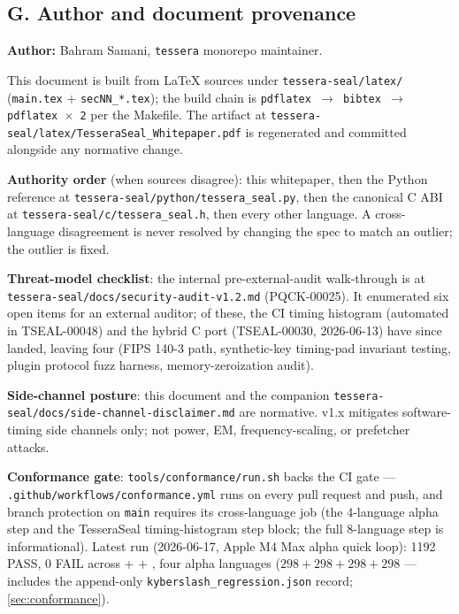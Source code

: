 \subsection*{G. Author and document provenance}
\label{sec:appendix:provenance}

\textbf{Author:} Bahram Samani, \texttt{tessera} monorepo maintainer.

This document is built from LaTeX sources under \texttt{tessera-seal/latex/} (\texttt{main.tex} + \texttt{secNN\_*.tex}); the build chain is \texttt{pdflatex $\rightarrow$ bibtex $\rightarrow$ pdflatex $\times$ 2} per the Makefile. The artifact at \texttt{tessera-seal/latex/TesseraSeal\_Whitepaper.pdf} is regenerated and committed alongside any normative change.

\textbf{Authority order} (when sources disagree): this whitepaper, then the Python reference at \texttt{tessera-seal/python/tessera\_seal.py}, then the canonical C ABI at \texttt{tessera-seal/c/tessera\_seal.h}, then every other language. A cross-language disagreement is never resolved by changing the spec to match an outlier; the outlier is fixed.

\textbf{Threat-model checklist}: the internal pre-external-audit walk-through is at \texttt{tessera-seal/docs/security-audit-v1.2.md} (PQCK-00025). It enumerated six open items for an external auditor; of these, the CI timing histogram (automated in TSEAL-00048) and the hybrid C port (TSEAL-00030, 2026-06-13) have since landed, leaving four (FIPS 140-3 path, synthetic-key timing-pad invariant testing, plugin protocol fuzz harness, memory-zeroization audit).

\textbf{Side-channel posture}: this document and the companion \texttt{tessera-seal/docs/side-channel-disclaimer.md} are normative. v1.x mitigates software-timing side channels only; not power, EM, frequency-scaling, or prefetcher attacks.

\textbf{Conformance gate}: \texttt{tools/conformance/run.sh} backs the CI gate --- \texttt{.github/workflows/conformance.yml} runs on every pull request and push, and branch protection on \texttt{main} requires its cross-language job (the 4-language alpha step and the TesseraSeal timing-histogram step block; the full 8-language step is informational). Latest run (2026-06-17, Apple M4 Max alpha quick loop): 1192 PASS, 0 FAIL across \pqid{} + \pqhash{} + \pqcrypt{}, four alpha languages ($298 + 298 + 298 + 298$ --- includes the append-only \texttt{kyberslash\_regression.json} record; \cref{sec:conformance}).
